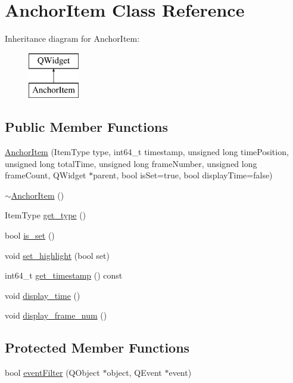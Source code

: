 \hypertarget{classAnchorItem}{}\section{Anchor\+Item Class Reference}
\label{classAnchorItem}
Inheritance diagram for Anchor\+Item\+:\begin{figure}[H]
\begin{center}
\leavevmode
\includegraphics[height=2.000000cm]{classAnchorItem}
\end{center}
\end{figure}
\subsection*{Public Member Functions}
\begin{DoxyCompactItemize}
\item 
\hyperlink{classAnchorItem_a06c620842bbbe71cd1066f08a5000196}{Anchor\+Item} (Item\+Type type, int64\+\_\+t timestamp, unsigned long time\+Position, unsigned long total\+Time, unsigned long frame\+Number, unsigned long frame\+Count, Q\+Widget $\ast$parent, bool is\+Set=true, bool display\+Time=false)
\item 
\hyperlink{classAnchorItem_aa53b59e4ced3b72ed61c28d467bf822f}{$\sim$\+Anchor\+Item} ()
\item 
Item\+Type \hyperlink{classAnchorItem_a3cb5fa754bc1bfd9bad4dd6e6ff22bb6}{get\+\_\+type} ()
\item 
bool \hyperlink{classAnchorItem_aff8a1bd4b6c6645fd1cec15ce4ba8474}{is\+\_\+set} ()
\item 
void \hyperlink{classAnchorItem_ae900d01f71ff480d4bbbfee8ef7fac80}{set\+\_\+highlight} (bool set)
\item 
int64\+\_\+t \hyperlink{classAnchorItem_a3bdcec9b92921e16810b5251a5273afa}{get\+\_\+timestamp} () const 
\item 
void \hyperlink{classAnchorItem_a3905061f30d8b6a77b00ad52311605af}{display\+\_\+time} ()
\item 
void \hyperlink{classAnchorItem_a4b9fb672e2ebc5289c116027dc8a383d}{display\+\_\+frame\+\_\+num} ()
\end{DoxyCompactItemize}
\subsection*{Protected Member Functions}
\begin{DoxyCompactItemize}
\item 
bool \hyperlink{classAnchorItem_a78686f7c51def036159b1dfe56be9b33}{event\+Filter} (Q\+Object $\ast$object, Q\+Event $\ast$event)
\end{DoxyCompactItemize}



